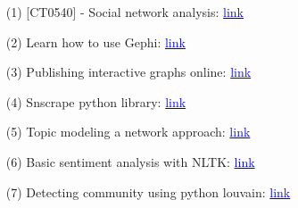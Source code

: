 \documentclass[fleqn,10pt]{SelfArx} %
\begin{document}
\begin{itemize}[noitemsep] 
\item [(1)] [CT0540] - Social network analysis: \href{https://www.unive.it/data/insegnamento/339916/programma}{\textcolor{blue}{link}} 
\item [(2)] Learn how to use Gephi: \href{https://gephi.org/users/}{\textcolor{blue}{link}} 
\item [(3)] Publishing interactive graphs online: \href{https://blog.miz.space/tutorial/2020/01/05/gephi-tutorial-sigma-js-plugin-publishing-interactive-graph-online/}{\textcolor{blue}{link}} 
\item [(4)] Snscrape python library: \href{https://pypi.org/project/snscrape/}{\textcolor{blue}{link}} 
\item [(5)] Topic modeling a network approach: \href{https://www.science.org/doi/10.1126/sciadv.aaq1360}{\textcolor{blue}{link}} 
\item [(6)] Basic sentiment analysis with NLTK: \href{https://towardsdatascience.com/basic-binary-sentiment-analysis-using-nltk-c94ba17ae386}{\textcolor{blue}{link}} 
\item [(7)] Detecting community using python louvain: \href{https://stackoverflow.com/questions/53087066/how-to-use-the-communities-module-python-louvain-in-networkx-2-2}{\textcolor{blue}{link}} 






\end{itemize}






\end{document}
